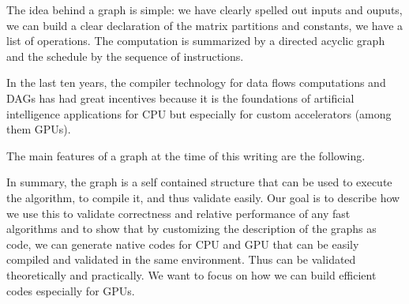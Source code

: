 \documentclass[acmsmall]{acmart}
\begin{document}
The idea behind a graph is simple: we have clearly spelled out inputs
and ouputs, we can build a clear declaration of the matrix partitions
and constants, we have a list of operations. The computation is
summarized by a directed acyclic graph and the schedule by the
sequence of instructions.

In the last ten years, the compiler technology for data flows
computations and DAGs has had great incentives because it is the
foundations of artificial intelligence applications for CPU but
especially for custom accelerators (among them GPUs).

The main features of a graph at the time of this writing are the
following.

In summary, the graph is a self contained structure that can be used
to execute the algorithm, to compile it, and thus validate easily. Our
goal is to describe how we use this to validate correctness and
relative performance of any fast algorithms and to show that by
customizing the description of the graphs as code, we can generate
native codes for CPU and GPU that can be easily compiled and validated
in the same environment.  Thus can be validated theoretically and
practically. We want to focus on how we can build efficient codes
especially for GPUs.
\end{document}
